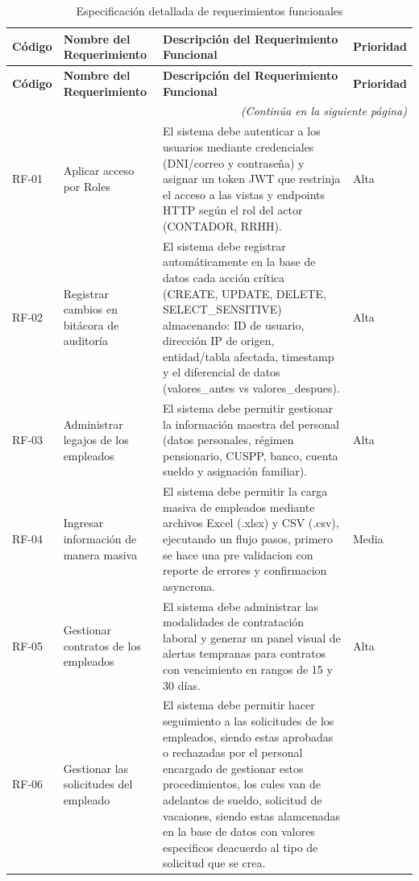 \begin{longtable}{|l|p{4cm}|p{6cm}|l|}
    \caption{Especificación detallada de requerimientos funcionales}
    \label{tab:anexo_especificacion_rf} \\
    \hline
    \textbf{Código} & \textbf{Nombre del Requerimiento} & \textbf{Descripción del Requerimiento Funcional} & \textbf{Prioridad} \\ \hline
    \endfirsthead
    \hline
    \textbf{Código} & \textbf{Nombre del Requerimiento} & \textbf{Descripción del Requerimiento Funcional} & \textbf{Prioridad} \\ \hline
    \endhead
    \hline
    \multicolumn{4}{r}{\textit{(Continúa en la siguiente página)}} \\
    \endfoot
    \bottomrule
    \endlastfoot

    RF-01 & 
    Aplicar acceso por Roles &
    El sistema debe autenticar a los usuarios mediante credenciales (DNI/correo y contraseña) y asignar un token JWT que restrinja el acceso a las vistas y endpoints HTTP según el rol del actor (CONTADOR, RRHH).&
    Alta \\ \hline
    RF-02 & 
    Registrar cambios en bitácora de auditoría & 
    El sistema debe registrar automáticamente en la base de datos cada acción crítica (CREATE, UPDATE, DELETE, SELECT_SENSITIVE) almacenando: ID de usuario, dirección IP de origen, entidad/tabla afectada, timestamp y el diferencial de datos (valores_antes vs valores_despues).
    & Alta \\ \hline
    RF-03 &
    Administrar legajos de los empleados & 
    El sistema debe permitir gestionar la información maestra del personal (datos personales, régimen pensionario, CUSPP, banco, cuenta sueldo y asignación familiar).
    & Alta \\ \hline
    RF-04 & 
    Ingresar información de manera masiva & 
    El sistema debe permitir la carga masiva de empleados mediante archivos Excel (.xlsx) y CSV (.csv), ejecutando un flujo pasos, primero se hace una pre validacion con reporte de errores y confirmacion asyncrona.
    & Media \\ \hline
    RF-05 & 
    Gestionar contratos de los empleados & 
    El sistema debe administrar las modalidades de contratación laboral y generar un panel visual de alertas tempranas para contratos con vencimiento en rangos de 15 y 30 días.
    & Alta \\ \hline
    RF-06 &
    Gestionar las solicitudes del empleado & 
    El sistema debe permitir hacer seguimiento a las solicitudes de los empleados, siendo estas aprobadas o rechazadas por el personal encargado de gestionar estos procedimientos, los cules van de adelantos de sueldo, solicitud de vacaiones, siendo estas alamcenadas en la base de datos con valores especificos deacuerdo al tipo de solicitud que se crea. 

\end{longtable}

